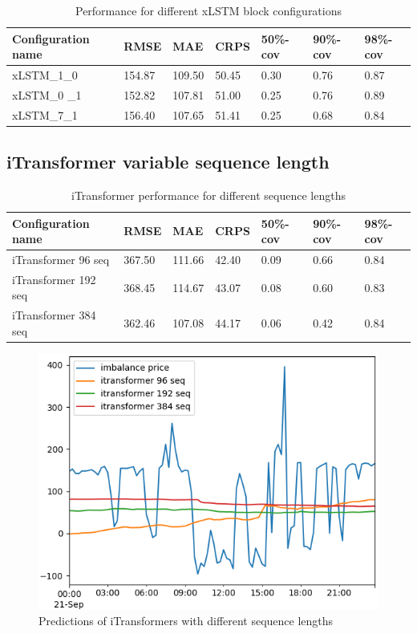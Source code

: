 \documentclass[class=scrbook, crop=false]{standalone}
\begin{document}
  \begin{table}[]
\centering
\begin{tabular}{l|l|l|l|l|l|l}
Configuration name &  RMSE & MAE & CRPS & 50\%-cov & 90\%-cov & 98\%-cov \\\hline
xLSTM\_1\_0 & 154.87 & 109.50& 50.45& 0.30 & 0.76 & 0.87 \\
xLSTM\_0 \_1& 152.82 & 107.81 & 51.00 & 0.25 & 0.76 & 0.89 \\
xLSTM\_7\_1 & 156.40 & 107.65 & 51.41 & 0.25 & 0.68 & 0.84 \\
\end{tabular}
\caption{Performance for different xLSTM block configurations}
\label{Table::Performance_xLSTM}
\end{table}

\subsection{iTransformer variable sequence length}

 \begin{table}[]
\centering
\begin{tabular}{l|l|l|l|l|l|l}
 Configuration name &  RMSE & MAE & CRPS & 50\%-cov & 90\%-cov & 98\%-cov \\\hline
 iTransformer 96 seq & 367.50 & 111.66 & 42.40&0.09 & 0.66 & 0.84 \\
 iTransformer 192 seq & 368.45 &114.67& 43.07& 0.08 & 0.60	 & 0.83 \\
 iTransformer 384 seq & 362.46 & 107.08& 44.17	& 0.06	 &0.42	 & 0.84\\
\end{tabular}
\caption{iTransformer performance for different sequence lengths}
\label{Table::Performance_sequence_length}
\end{table}


\begin{figure}
  \centering
  \includegraphics[width=.8\linewidth]{../images/results/itransformer_sequence_length_results.png}
  \caption{Predictions of iTransformers with different sequence lengths}
\label{Result::iTransformer_sequence_length}
\end{figure}
\end{document}
